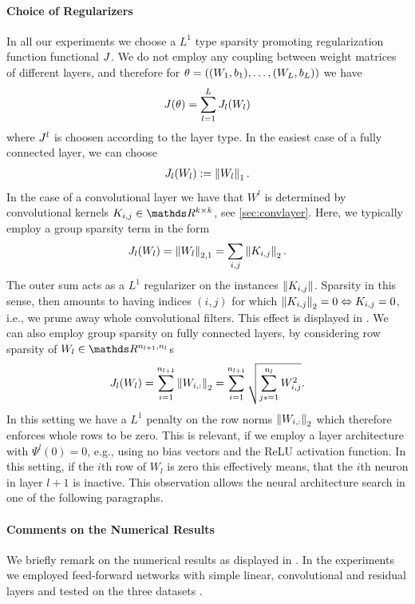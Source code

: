 \paragraph{Choice of Regularizers}
%
In all our experiments we choose a $L^1$ type sparsity promoting regularization function functional $J$. We do not employ any coupling between weight matrices of different layers, and therefore for $\theta=((W_1,b_1),\ldots, (W_L,b_L))$ we have
%
\begin{align*}
J(\theta) = \sum_{l=1}^L J_l(W_l)
\end{align*}
%
%
where $J^l$ is choosen according to the layer type. In the easiest case of a fully connected layer, we can choose
%
\begin{align*}
J_l(W_l) := \left\|W_l\right\|_1.
\end{align*}
%
In the case of a convolutional layer we have that $W^l$ is determined by convolutional kernels $K_{i,j}\in\R^{k\times k}$, see \cref{sec:convlayer}. Here, we typically employ a group sparsity term in the form
%
\begin{align*}
J_l(W_l) = \left\|W_l\right\|_{2,1} = \sum_{i,j} \left\|K_{i,j}\right\|_2.
\end{align*}
%
The outer sum acts as a $L^1$ regularizer on the instances $\left\|K_{i,j}\right\|$. Sparsity in this sense, then amounts to having indices $(i,j)$ for which $\left\|K_{i,j}\right\|_2=0 \Leftrightarrow K_{i,j}=0$, i.e., we prune away whole convolutional filters. This effect is displayed in \cite[Fig. 1]{bungert2022bregman}.
We can also employ group sparsity on fully connected layers, by considering row sparsity of $W_l\in\R^{n_{l+1}, n_l}$s
%
\begin{align*}
J_l(W_l) = \sum_{i=1}^{n_{l+1}} \left\|W_{i,:}\right\|_2 = \sum_{i=1}^{n_{l+1}} \sqrt{\sum_{js=1}^{n_{l}} W_{i,j}^2}.
\end{align*}
%
%
%
In this setting we have a $L^1$ penalty on the row norms $\left\|W_{i,:}\right\|_2$ which therefore enforces whole rows to be zero. This is relevant, if we employ a layer architecture with $\Psi^l(0)=0$, e.g., using no bias vectors and the ReLU activation function. In this setting, if the $i$th row of $W_l$ is zero this effectively means, that the $i$th neuron in layer $l+1$ is inactive. This observation allows the neural architecture search in one of the following paragraphs.
\paragraph{Comments on the Numerical Results} We briefly remark on the numerical results as displayed in \cite[Sec. 4]{bungert2022bregman}. In the experiments we employed feed-forward networks with simple linear, convolutional and residual layers and tested on the three datasets \cite{krizhevsky2009learning, Han17, leCun10}.

